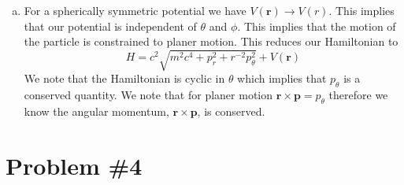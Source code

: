 \documentclass[11pt]{article}
\numberwithin{equation}{section}
\begin{document}
\begin{enumerate}[(a)]
\item For a spherically symmetric potential we have $V(\mathbf{r})\rightarrow{V(r)}$. This 
implies that our potential is independent of $\theta$ and $\phi$. This implies that the motion
of the particle is constrained to planer motion. This reduces our Hamiltonian to 
$$H = c^2\sqrt{m^2c^4+p_r^2+r^{-2}p_{\theta}^2} + V(\mathbf{r})$$
We note that the Hamiltonian is cyclic in $\theta$ which implies that $p_{\theta}$ is a 
conserved quantity. We note that for planer motion $\mathbf{r}\times\mathbf{p}=p_{\theta}$ 
therefore we know the angular momentum, $\mathbf{r}\times\mathbf{p}$, is conserved.
\end{enumerate}

\pagebreak

\section{Problem \#4}
\end{document}

